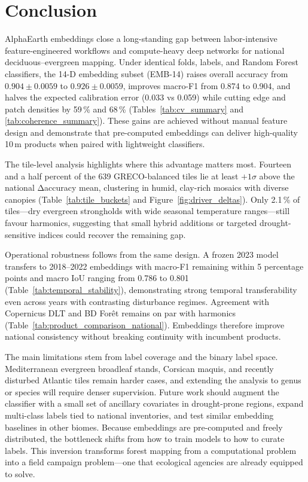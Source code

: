 \documentclass[utf8]{FrontiersinHarvard}
\begin{document}
\section{Conclusion}

AlphaEarth embeddings close a long-standing gap between labor-intensive feature-engineered workflows and compute-heavy deep networks for national deciduous–evergreen mapping. Under identical folds, labels, and Random Forest classifiers, the 14-D embedding subset (EMB-14) raises overall accuracy from $0.904 \pm 0.0059$ to $0.926 \pm 0.0059$, improves macro-F1 from 0.874 to 0.904, and halves the expected calibration error (0.033 vs 0.059) while cutting edge and patch densities by 59\,\% and 68\,\% (Tables~\ref{tab:cv_summary} and \ref{tab:coherence_summary}). These gains are achieved without manual feature design and demonstrate that pre-computed embeddings can deliver high-quality 10\,m products when paired with lightweight classifiers.

The tile-level analysis highlights where this advantage matters most. Fourteen and a half percent of the 639 GRECO-balanced tiles lie at least \(+1\sigma\) above the national Δaccuracy mean, clustering in humid, clay-rich mosaics with diverse canopies (Table~\ref{tab:tile_buckets} and Figure~\ref{fig:driver_deltas}). Only 2.1\,\% of tiles—dry evergreen strongholds with wide seasonal temperature ranges—still favour harmonics, suggesting that small hybrid additions or targeted drought-sensitive indices could recover the remaining gap.

Operational robustness follows from the same design. A frozen 2023 model transfers to 2018–2022 embeddings with macro-F1 remaining within 5 percentage points and macro IoU ranging from 0.786 to 0.801 (Table~\ref{tab:temporal_stability}), demonstrating strong temporal transferability even across years with contrasting disturbance regimes. Agreement with Copernicus DLT and BD Forêt remains on par with harmonics (Table~\ref{tab:product_comparison_national}). Embeddings therefore improve national consistency without breaking continuity with incumbent products.

The main limitations stem from label coverage and the binary label space. Mediterranean evergreen broadleaf stands, Corsican maquis, and recently disturbed Atlantic tiles remain harder cases, and extending the analysis to genus or species will require denser supervision. Future work should augment the classifier with a small set of ancillary covariates in drought-prone regions, expand multi-class labels tied to national inventories, and test similar embedding baselines in other biomes. Because embeddings are pre-computed and freely distributed, the bottleneck shifts from how to train models to how to curate labels. This inversion transforms forest mapping from a computational problem into a field campaign problem—one that ecological agencies are already equipped to solve.
\end{document}
